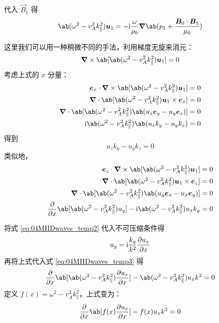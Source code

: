 代入 $\vec{B}_1$ 得
\begin{equation}
\ab( \omega^2 - v_A^2 k_\parallel^2 ) \vec{u}_1
= - \im \frac{\omega}{\rho_0} \grad{\ab( p_1 + \frac{\vec{B}_0 \cdot \vec{B}_1}{\mu_0} )}
\end{equation}

这里我们可以用一种稍微不同的手法，利用梯度无旋来消元：
\begin{equation}
\curl{\ab[ \ab( \omega^2 - v_A^2 k_\parallel^2 ) \vec{u}_1 ]} = 0
\end{equation}
考虑上式的 $x$ 分量：
\begin{equation}\begin{aligned}
\vec{e}_x \cdot \curl{\ab[ \ab( \omega^2 - v_A^2 k_\parallel^2 ) \vec{u}_1 ]} &= 0 \\
\dive{\ab[ \ab( \omega^2 - v_A^2 k_\parallel^2 ) \vec{u}_1 \times \vec{e}_x ]} &= 0 \\
\dive{\ab[ \ab( \omega^2 - v_A^2 k_\parallel^2 ) \ab( u_z \vec{e}_y - u_y \vec{e}_z ) ]} &= 0 \\
\im \ab( \omega^2 - v_A^2 k_\parallel^2 ) \ab( u_z k_y - u_y k_z ) &= 0
\end{aligned}\end{equation}
得到
\begin{equation}\label{eq:04MHDwaves_temp2}
u_z k_y - u_y k_z = 0
\end{equation}
类似地，
\begin{equation}\begin{aligned}\label{eq:04MHDwaves_temp3}
\vec{e}_z \cdot \curl{\ab[ \ab( \omega^2 - v_A^2 k_\parallel^2 ) \vec{u}_1 ]} &= 0 \\
\dive{\ab[ \ab( \omega^2 - v_A^2 k_\parallel^2 ) \vec{u}_1 \times \vec{e}_z ]} &= 0 \\
\dive{\ab[ \ab( \omega^2 - v_A^2 k_\parallel^2 ) \ab( u_y \vec{e}_x - u_x \vec{e}_y ) ]} &= 0 \\
\pdv{}{x} \ab[ \ab( \omega^2 - v_A^2 k_\parallel^2 ) u_y ]
- \im \ab( \omega^2 - v_A^2 k_\parallel^2 ) u_x k_y &= 0
\end{aligned}\end{equation}

将式 \ref{eq:04MHDwaves_temp2} 代入不可压缩条件得
\begin{equation}
u_y = \mathrm{i} \frac{k_y}{k^2} \pdv{u_x}{x}
\end{equation}
再将上式代入式 \ref{eq:04MHDwaves_temp3} 得
\begin{equation} \label{eq:04MHDwaves_temp4}
\pdv{}{x} \ab[ \ab( \omega^2 - v_A^2 k_\parallel^2 ) \pdv{u_x}{x} ]
- \ab( \omega^2 - v_A^2 k_\parallel^2 ) u_x k^2
= 0
\end{equation}
定义 $f(x) = \omega^2 - v_A^2 k_\parallel^2$，上式变为：
\begin{equation}
\pdv{}{x} \ab[ f(x) \pdv{u_x}{x} ]
- f(x) u_x k^2
= 0
\end{equation}

